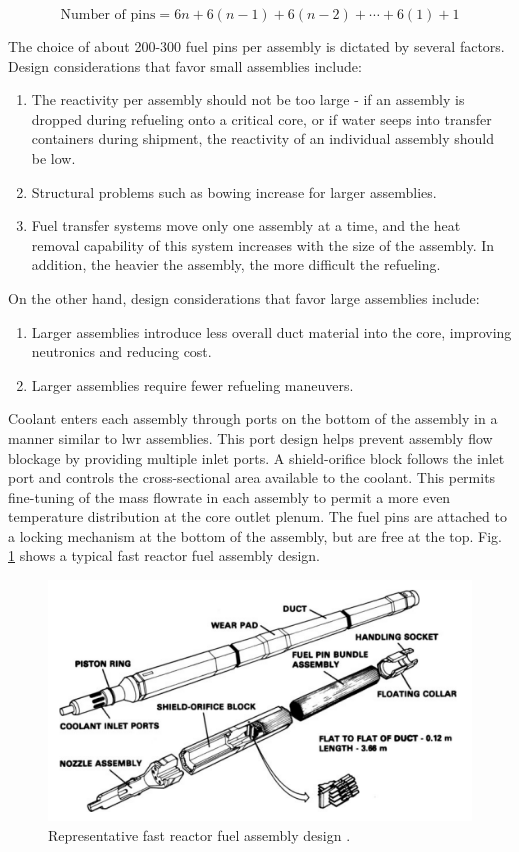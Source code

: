 \documentclass[10pt]{article}
\numberwithin{equation}{section} %
\begin{document}
\begin{equation}
\textrm{Number of pins} = 6n+6(n-1)+6(n-2)+\cdots+6(1)+1
\end{equation}

The choice of about 200-300 fuel pins per assembly is dictated by several factors. Design considerations that favor small assemblies include:

\begin{enumerate}
\item The reactivity per assembly should not be too large - if an assembly is dropped during refueling onto a critical core, or if water seeps into transfer containers during shipment, the reactivity of an individual assembly should be low. 
\item Structural problems such as bowing increase for larger assemblies.
\item Fuel transfer systems move only one assembly at a time, and the heat removal capability of this system increases with the size of the assembly. In addition, the heavier the assembly, the more difficult the refueling.
\end{enumerate}

On the other hand, design considerations that favor large assemblies include:

\begin{enumerate}
\item Larger assemblies introduce less overall duct material into the core, improving neutronics and reducing cost.
\item Larger assemblies require fewer refueling maneuvers.
\end{enumerate}

Coolant enters each assembly through ports on the bottom of the assembly in a manner similar to \gls{lwr} assemblies. This port design helps prevent assembly flow blockage by providing multiple inlet ports. A shield-orifice block follows the inlet port and controls the cross-sectional area available to the coolant. This permits fine-tuning of the mass flowrate in each assembly to permit a more even temperature distribution at the core outlet plenum. The fuel pins are attached to a locking mechanism at the bottom of the assembly, but are free at the top. Fig. \ref{fig:FastReactorFuelAssembly} shows a typical fast reactor fuel assembly design. 

\begin{figure}[H]
\centering
\includegraphics[width=0.6\linewidth]{figures/FastReactorFuelAssembly.pdf}
\caption{Representative fast reactor fuel assembly design \cite{FastReactors}.}
\label{fig:FastReactorFuelAssembly}
\end{figure}
\end{document}
